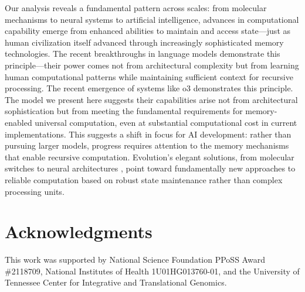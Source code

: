 \documentclass[12pt]{article}
\begin{document}
Our analysis reveals a fundamental pattern across scales: from molecular mechanisms to neural systems to artificial intelligence, advances in computational capability emerge from enhanced abilities to maintain and access state---just as human civilization itself advanced through increasingly sophisticated memory technologies.
The recent breakthroughs in language models demonstrate this principle---their power comes not from architectural complexity but from learning human computational patterns while maintaining sufficient context for recursive processing.
The recent emergence of systems like o3 \cite{guan2024deliberative} demonstrates this principle.
The model we present here suggests their capabilities arise not from architectural sophistication but from meeting the fundamental requirements for memory-enabled universal computation, even at substantial computational cost in current implementations.
This suggests a shift in focus for AI development: rather than pursuing larger models, progress requires attention to the memory mechanisms that enable recursive computation.
Evolution's elegant solutions, from molecular switches to neural architectures \cite{burrill2010making}, point toward fundamentally new approaches to reliable computation based on robust state maintenance rather than complex processing units.

\section*{Acknowledgments}
This work was supported by National Science Foundation PPoSS Award \#2118709, National Institutes of Health 1U01HG013760-01, and the University of Tennessee Center for Integrative and Translational Genomics.

\begingroup
\footnotesize


\endgroup
\end{document}
